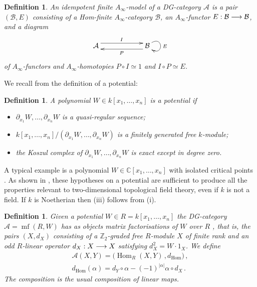 \documentclass[english,letter paper,12pt,leqno]{article}
\theoremstyle{example}
\newtheorem{definition}[theorem]{Definition}
\numberwithin{equation}{section}
\def\AA{\mathcal{A}}
\def\BB{\mathcal{B}}
\def\Hom{\operatorname{Hom}}
\DeclareMathOperator{\mfdg}{mf}
\begin{document}
\begin{definition} An \emph{idempotent finite $A_\infty$-model} of a DG-category $\AA$ is a pair $(\BB, E)$ consisting of a Hom-finite $A_\infty$-category $\BB$, an $A_\infty$-functor $E: \BB \lto \BB$, and a diagram
\[
\xymatrix@C+3pc{
\AA \ar@<1ex>[r]^I & \BB \ar@(ur,dr)^E \ar@<1ex>[l]^P
}
\]
of $A_\infty$-functors and $A_\infty$-homotopies $P \circ I \simeq 1$ and $I \circ P \simeq E$. %
\end{definition}

We recall from \cite{lgdual} the definition of a potential:

\begin{definition}\label{defn:potential} A polynomial $W \in k[x_1,\ldots,x_n]$ is a \textsl{potential} if
\begin{itemize}
\item[(i)] $\partial_{x_1} W,\ldots,\partial_{x_n} W$ is a quasi-regular sequence;
\item[(ii)] $k[x_1,\ldots,x_n]/(\partial_{x_1} W,\ldots,\partial_{x_n} W)$ is a finitely generated free $k$-module;
\item[(iii)] the Koszul complex of $\partial_{x_1} W,\ldots,\partial_{x_n} W$ is exact except in degree zero.
\end{itemize}
\end{definition}

A typical example is a polynomial $W \in \mathbb{C}[x_1,\ldots,x_n]$ with isolated critical points \cite[Example 2.5]{lgdual}. As shown in \cite{lgdual}, these hypotheses on a potential are sufficient to produce all the properties relevant to two-dimensional topological field theory, even if $k$ is not a field. If $k$ is Noetherian then (iii) follows from (i).

\begin{definition} Given a potential $W \in R = k[x_1,\ldots,x_n]$ the DG-category $\AA = \mfdg(R,W)$ has as objects \emph{matrix factorisations} of $W$ over $R$ \cite{EisenbudMF}, that is, the pairs $(X, d_X)$ consisting of a $\mathbb{Z}_2$-graded free $R$-module $X$ of finite rank and an odd $R$-linear operator $d_X: X \longrightarrow X$ satisfying $d_X^2 = W \cdot 1_X$. We define
\begin{gather*}
\AA(X,Y) = \big( \Hom_R(X,Y) \,, d_{\Hom} \big)\,,\\
d_{\Hom}(\alpha)  = d_Y \circ \alpha - (-1)^{|\alpha|} \alpha \circ d_X\,.
\end{gather*}
The composition is the usual composition of linear maps.
\end{definition}
\end{document}
